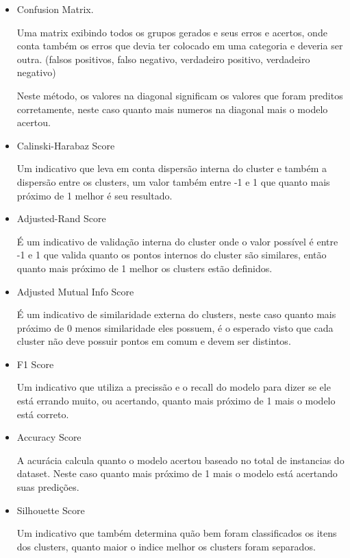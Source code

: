 \begin{itemize}
	\item Confusion Matrix.
		
		Uma matrix exibindo todos os grupos gerados e seus erros e acertos, onde conta também os erros que devia ter colocado em uma categoria e deveria ser outra. (falsos positivos, falso negativo, verdadeiro positivo, verdadeiro negativo)

		Neste método, os valores na diagonal significam os valores que foram preditos corretamente, neste caso quanto mais numeros na diagonal mais o modelo acertou.
	
	\item Calinski-Harabaz Score
		
		Um indicativo que leva em conta dispersão interna do cluster e também a dispersão entre os clusters, um valor também entre -1 e 1 que quanto mais próximo de 1 melhor é seu resultado.
	
	\item Adjusted-Rand Score
	
		É um indicativo de validação interna do cluster onde o valor possível é entre -1 e 1 que valida quanto os pontos internos do cluster são similares, então quanto mais próximo de 1 melhor os clusters estão definidos.
	
	\item Adjusted Mutual Info Score
	
		É um indicativo de similaridade externa do clusters, neste caso quanto mais próximo de 0 menos similaridade eles possuem, é o esperado visto que cada cluster não deve possuir pontos em comum e devem ser distintos.
	
	\item F1 Score
	
		Um indicativo que utiliza a precissão e o recall do modelo para dizer se ele está errando muito, ou acertando, quanto mais próximo de 1 mais o modelo está correto.
	
	\item Accuracy Score
	
		A acurácia calcula quanto o modelo acertou baseado no total de instancias do dataset. Neste caso quanto mais próximo de 1 mais o modelo está acertando suas predições.
		
		
	\item Silhouette Score
	
		Um indicativo que também determina quão bem foram classificados os itens dos clusters, quanto maior o indice melhor os clusters foram separados.
\end{itemize}

